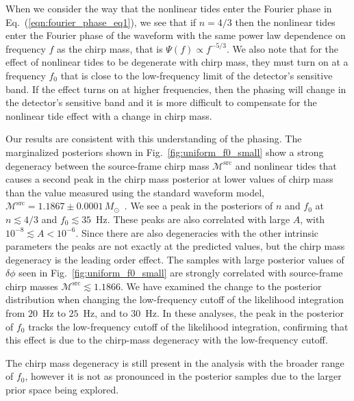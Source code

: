 When we consider the way that the nonlinear tides enter the Fourier phase in Eq.~(\ref{eqn:fourier_phase_eq1}), we see that if $n = 4/3$ then the nonlinear tides enter the Fourier phase of the waveform with the same power law dependence on frequency $f$ as the chirp mass, that is $\Psi(f) \propto f^{-5/3}$. We also note that for the effect of nonlinear tides to be degenerate with chirp mass, they must turn on at a frequency $f_0$ that is close to the low-frequency limit of the detector's sensitive band. If the effect turns on at higher frequencies, then the phasing will change in the detector's sensitive band and it is more difficult to compensate for the nonlinear tide effect with a change in chirp mass. 

Our results are consistent with this understanding of the phasing. The marginalized posteriors shown in Fig.~\ref{fig:uniform_f0_small} show a strong degeneracy between the source-frame chirp mass $\mathcal{M}^\textrm{src}$ and nonlinear tides that causes a second peak in the chirp mass posterior at lower values of chirp mass than the value measured using the standard waveform model, $\mathcal{M}^\textrm{src} = 1.1867\pm0.0001\, M_\odot$~\citep{de2018tidal}. We see a peak in the posteriors of $n$ and $f_0$ at $n \lesssim 4/3$ and $f_0 \lesssim 35$~Hz. These peaks are also correlated with large $A$, with $10^{-8} \lesssim A < 10^{-6}$. Since there are also degeneracies with the other intrinsic parameters the peaks are not exactly at the predicted values, but the chirp mass degeneracy is the leading order effect. The samples with large posterior values of $\delta\phi$ seen in Fig.~\ref{fig:uniform_f0_small} are strongly correlated with source-frame chirp masses $\mathcal{M}^\textrm{src} \lesssim 1.1866.$ We have examined the change to the posterior distribution when changing the low-frequency cutoff of the likelihood integration from $20$~Hz to $25$~Hz, and to $30$~Hz. In these analyses, the peak in the posterior of $f_0$ tracks the low-frequency cutoff of the likelihood integration, confirming that this effect is due to the chirp-mass degeneracy with the low-frequency cutoff.

The chirp mass degeneracy is still present in the analysis with the broader range of $f_0$, however it is not as pronounced in the posterior samples due to the larger prior space being explored.

